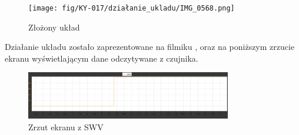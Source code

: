 \documentclass[11pt, a4paper]{article}
\begin{document}
\vspace{0.5cm}
\begin{figure}[h!]
    \centering
    \texttt{[image: fig/KY-017/działanie\_ukladu/IMG\_0568.png]}
    \caption{Złożony układ}
    \label{fig:smiga}
\end{figure}
\vspace{0.5cm}


Działanie układu zostało zaprezentowane na filmiku \cite{yt}, oraz na poniższym zrzucie ekranu
wyświetlającym dane odczytywane z czujnika.

\begin{figure}[h!]
    \centering
    \includegraphics[width=0.8\textwidth]{fig/KY-017/działanie_ukladu/SWV.png}
    \caption{Zrzut ekranu z SWV}
    \label{fig:my_label}
\end{figure}
\vspace{0.5cm}

\printbibliography[heading=bibintoc]
\end{document}
